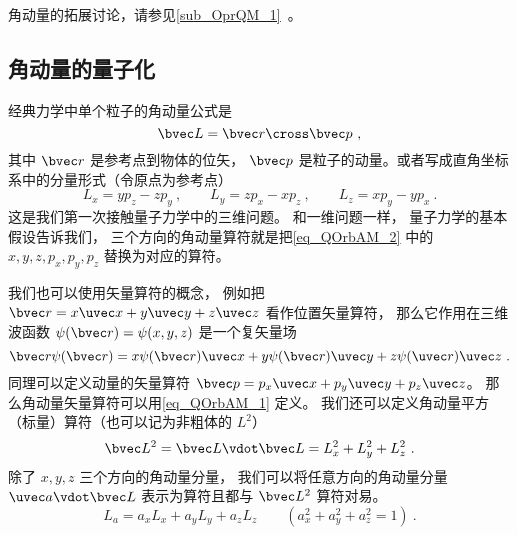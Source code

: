 
\begin{issues}
\issueDraft
\issueMissDepend
\end{issues}



角动量的拓展讨论，请参见\autoref{sub_OprQM_1}~。

\subsection{角动量的量子化}

经典力学中单个粒子的角动量公式是
\begin{equation}\label{eq_QOrbAM_1}
\bvec L = \bvec r \cross \bvec p~,
\end{equation}
其中 $\bvec r$ 是参考点到物体的位矢， $\bvec p$ 是粒子的动量。或者写成直角坐标系中的分量形式（令原点为参考点）
\begin{equation}\label{eq_QOrbAM_2}
L_x = y p_z - z p_y ~,\qquad
L_y = z p_x - x p_z ~,\qquad
L_z = x p_y - y p_x~.
\end{equation}   
这是我们第一次接触量子力学中的三维问题。 和一维问题一样， 量子力学的基本假设告诉我们， 三个方向的角动量算符就是把\autoref{eq_QOrbAM_2} 中的 $x, y, z, p_x, p_y, p_z$ 替换为对应的算符。

我们也可以使用矢量算符的概念， 例如把 $\bvec r = x\uvec x + y\uvec y + z\uvec z$ 看作位置矢量算符， 那么它作用在三维波函数 $\psi(\bvec r) = \psi(x, y, z)$ 是一个复矢量场
\begin{equation}
\bvec r \psi(\bvec r) = x \psi(\bvec r) \uvec x + y \psi(\bvec r) \uvec y + z \psi(\uvec r) \uvec z~.
\end{equation}
同理可以定义动量的矢量算符 $\bvec p = p_x \uvec x + p_y\uvec y + p_z\uvec z$。 那么角动量矢量算符可以用\autoref{eq_QOrbAM_1} 定义。 我们还可以定义角动量平方（标量）算符（也可以记为非粗体的 $L^2$）
\begin{equation}
\bvec L^2 = \bvec L \vdot \bvec L = L_x^2 + L_y^2 + L_z^2~.
\end{equation}
除了 $x, y, z$ 三个方向的角动量分量， 我们可以将任意方向的角动量分量 $\uvec a \vdot \bvec L$ 表示为算符且都与 $\bvec L^2$ 算符对易。
\begin{equation}
L_a = a_x L_x + a_y L_y + a_z L_z \qquad (a_x^2 + a_y^2 + a_z^2 = 1)~.
\end{equation}

